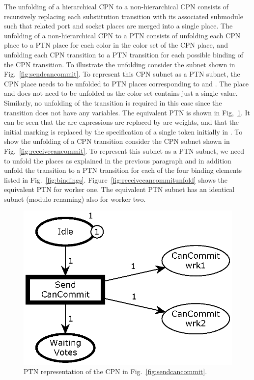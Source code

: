 The unfolding of a hierarchical CPN to a non-hierarchical CPN consists
of recursively replacing each substitution transition with its
associated submodule such that related port and socket places are
merged into a single place. The unfolding of a non-hierarchical CPN to
a PTN consists of unfolding each CPN place to a PTN place for each
color in the color set of the CPN place, and unfolding each CPN
transition to a PTN transition for each possible binding of the CPN
transition.  To illustrate the unfolding consider the subnet shown in
Fig.~\ref{fig:sendcancommit}. To represent this CPN subnet as a PTN
subnet, the CPN place  needs to be unfolded to PTN
places corresponding to  and . The
place  and  does not need to be
unfolded as the  color set contains just a single
value. Similarly, no unfolding of the 
transition is required in this case since the transition does not have
any variables. The equivalent PTN is shown in
Fig,~\ref{fig:sendcancommitunfold}. It can be seen that the arc
expressions are replaced by arc weights, and that the initial marking
is replaced by the specification of a single token initially in
. To show the unfolding of a CPN transition consider the
CPN subnet shown in Fig.~\ref{fig:receivecancommit}. To represent this
subnet as a PTN subnet, we need to unfold the places as explained in
the previous paragraph and in addition unfold the transition
 to a PTN transition for each of the four
binding elements listed in
Fig.~\ref{fig:bindings}. Figure~\ref{fig:receivecancommitunfold} shows
the equivalent PTN for worker one. The equivalent PTN subnet has an
identical subnet (modulo renaming) also for worker two.



\begin{figure}[b]
\centering
\includegraphics[scale=.45]{figures/PTSendCanCommit.eps}
\caption{PTN representation of the CPN in Fig.~\ref{fig:sendcancommit}.}
\label{fig:sendcancommitunfold}
\end{figure}


